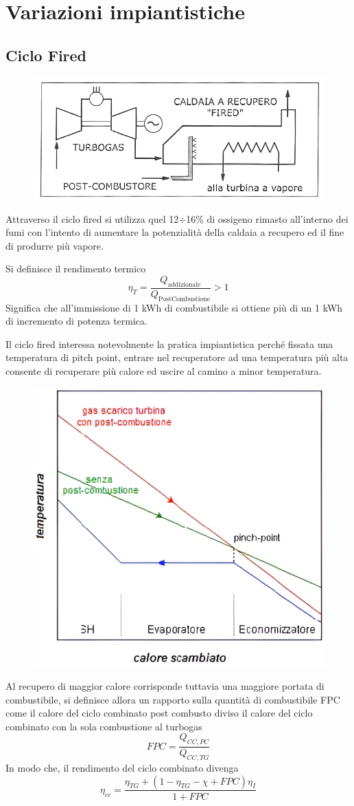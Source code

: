 \newpage

\section{Variazioni impiantistiche}
\subsection{Ciclo Fired}
\begin{adjustwidth}{2in}{}	
\begin{figure}[H]
	\centering
	\includegraphics[width=0.5\linewidth]{immagini/impianticombinati12}
	\label{fig:impianticombinati12}
\end{figure}
	Attraverso il ciclo fired si utilizza quel 12$\div$16\% di ossigeno rimasto all'interno dei fumi con l'intento di aumentare la potenzialità della caldaia a recupero ed il fine di produrre più vapore.
	\newline 
	
	Si definisce il rendimento termico
	\[\eta_T = \dfrac{Q_\text{addizionale}}{Q_\text{PostCombustione}}>1\]
	Significa che all'immissione di 1 kWh di combustibile si ottiene più di un 1 kWh di incremento di potenza termica.\newline 
	
	Il ciclo fired interessa notevolmente la pratica impiantistica perché fissata una temperatura di pitch point, entrare nel recuperatore ad una temperatura più alta consente di recuperare più calore ed uscire al camino a minor temperatura.	
\begin{figure}[H]
	\centering
	\includegraphics[width=0.5\linewidth]{immagini/impianticombinati13}
	\label{fig:impianticombinati13}
\end{figure}
	Al recupero di maggior calore corrisponde tuttavia una maggiore portata di combustibile, si definisce allora un rapporto sulla quantità di combustibile FPC come il calore del ciclo combinato post combusto diviso il calore del ciclo combinato con la sola combustione al turbogas
	\[FPC = \dfrac{Q_{CC,PC}}{Q_{CC,TG}}\]
	In modo che, il rendimento del ciclo combinato divenga
	\[\eta_{cc} = \dfrac{\eta_{TG} + (1-\eta_{TG}-\chi+FPC)\eta_I}{1+FPC}\]
\end{adjustwidth}

